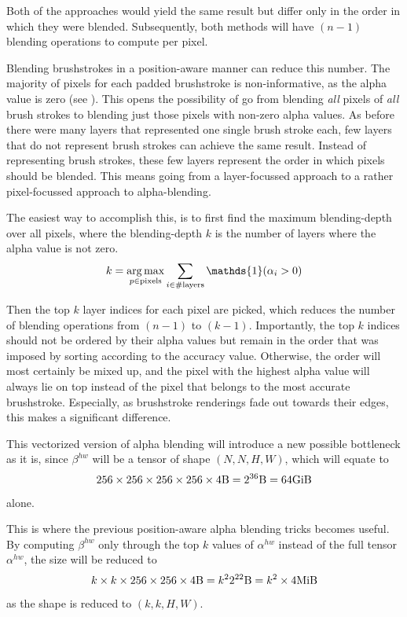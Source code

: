 Both of the approaches would yield the same result but differ only in the order in which they were blended.
Subsequently, both methods will have $(n-1)$ blending operations to compute per pixel.

Blending brushstrokes in a position-aware manner can reduce this number.
The majority of pixels for each padded brushstroke is non-informative, as the alpha value is zero (see ).
This opens the possibility of go from blending \textit{all} pixels of \textit{all} brush strokes to blending just those pixels with non-zero alpha values.
As before there were many layers that represented one single brush stroke each, few layers that do not represent brush strokes can achieve the same result.
Instead of representing brush strokes, these few layers represent the order in which pixels should be blended.
This means going from a layer-focussed approach to a rather pixel-focussed approach to alpha-blending.

The easiest way to accomplish this, is to first find the maximum blending-depth over all pixels, where the blending-depth $k$ is the number of layers where the alpha value is not zero.
\begin{align}
    k = \argmax_{p \in \text{pixels}} \sum_{i \in \# \text{layers}} \mathds{1}(\alpha_i > 0)
\end{align}

Then the top $k$ layer indices for each pixel are picked, which reduces the number of blending operations from $(n-1)$ to $(k-1)$.
Importantly, the top $k$ indices should not be ordered by their alpha values but remain in the order that was imposed by sorting according to the accuracy value.
Otherwise, the order will most certainly be mixed up, and the pixel with the highest alpha value will always lie on top instead of the pixel that belongs to the most accurate brushstroke.
Especially, as brushstroke renderings fade out towards their edges, this makes a significant difference.



This vectorized version of alpha blending will introduce a new possible bottleneck as it is, since $\beta^{hw}$ will be a tensor of shape $(N, N, H, W)$, which will equate to
$$
256 \times 256 \times 256 \times 256 \times 4 \si{\byte} = 2^{36}\si{\byte} = 64\si{\gibi\byte}
$$
alone.

This is where the previous position-aware alpha blending tricks becomes useful.
By computing $\beta^{hw}$ only through the top $k$ values of $\alpha^{hw}$ instead of the full tensor $\alpha^{hw}$, the size will be reduced to
$$
k \times k \times 256 \times 256 \times 4 \si{\byte} = k^2 2^{22}\si{\byte} = k^2 \times 4\si{\mebi\byte}
$$
as the shape is reduced to $(k, k, H, W)$.

